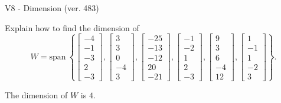 \begin{exercise}
  \begin{exerciseTitle}V8 - Dimension (ver. 483)\end{exerciseTitle}
  \begin{exerciseStatement}
    Explain how to find the dimension of 
\[W=\mathrm{span}\ \left\{\left[\begin{array}{r}
-4 \\
-1 \\
-3 \\
2 \\
-3
\end{array}\right] , \left[\begin{array}{r}
3 \\
3 \\
0 \\
-4 \\
3
\end{array}\right] , \left[\begin{array}{r}
-25 \\
-13 \\
-12 \\
20 \\
-21
\end{array}\right] , \left[\begin{array}{r}
-1 \\
-2 \\
1 \\
2 \\
-3
\end{array}\right] , \left[\begin{array}{r}
9 \\
3 \\
6 \\
-4 \\
12
\end{array}\right] , \left[\begin{array}{r}
1 \\
-1 \\
1 \\
-2 \\
3
\end{array}\right]\right\}.\]



  \end{exerciseStatement}
  \begin{exerciseAnswer}
   The dimension of \(W\) is  \(4\).
  


  \end{exerciseAnswer}
\end{exercise}
